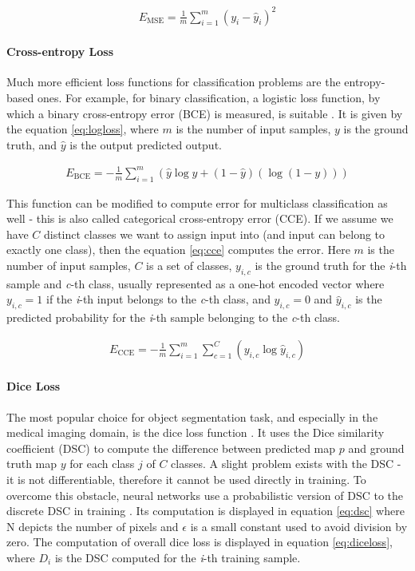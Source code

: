 \begin{align}
\label{eq:mse}
    E_\text{MSE} = \frac{1}{m}\sum_{i=1}^m(y_i-\hat{y}_i)^2
\end{align}

\paragraph{Cross-entropy Loss}
Much more efficient loss functions for classification problems are the entropy-based ones. For example, for binary classification, a logistic loss function, by which a binary cross-entropy error (BCE) is measured, is suitable \cite{Santosh2022-2}. It is given by the equation \ref{eq:logloss}, where $m$ is the number of input samples, $y$ is the ground truth, and $\hat{y}$ is the output predicted output.

\begin{align}
\label{eq:logloss}
    E_\text{BCE} = -\frac{1}{m}\sum_{i=1}^m(\hat{y}\log{y}+(1-\hat{y})(\log{(1-y)}))
\end{align}

This function can be modified to compute error for multiclass classification as well - this is also called categorical cross-entropy error (CCE). If we assume we have $C$ distinct classes we want to assign input into (and input can belong to exactly one class), then the equation \ref{eq:cce} computes the error. Here $m$ is the number of input samples, $C$ is a set of classes, $y_{i,c}$ is the ground truth for the \textit{i}-th sample and \textit{c}-th class, usually represented as a one-hot encoded vector where $y_{i,c}=1$ if the \textit{i}-th input belongs to the \textit{c}-th class, and $y_{i,c}=0$ and $\hat{y}_{i,c}$ is the predicted probability for the \textit{i}-th sample belonging to the \textit{c}-th class.

\begin{align}
\label{eq:cce}
    E_\text{CCE} = -\frac{1}{m}\sum_{i=1}^m\sum_{c=1}^C(y_{i,c}\log{\hat{y}_{i,c}})
\end{align}

\paragraph{Dice Loss}
The most popular choice for object segmentation task, and especially in the medical imaging domain, is the dice loss function \cite{Zhang2021}. It uses the Dice similarity coefficient (DSC) to compute the difference between predicted map $p$ and ground truth map $y$ for each class $j$ of $C$ classes. A slight problem exists with the DSC - it is not differentiable, therefore it cannot be used directly in training. To overcome this obstacle, neural networks use a probabilistic version of DSC to the discrete DSC in training \cite{Zhang2021}. Its computation is displayed in equation \ref{eq:dsc} where N depicts the number of pixels and $\epsilon$ is a small constant used to avoid division by zero. The computation of overall dice loss is displayed in equation \ref{eq:diceloss}, where $D_i$ is the DSC computed for the \textit{i}-th training sample.

